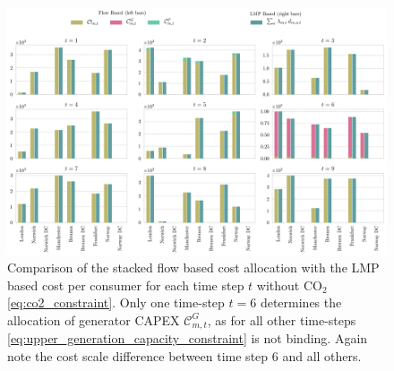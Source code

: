 \documentclass[11pt]{article}
\newcommand{\allocateCapexGeneration}{\mathcal{C}^{G}_{m,t}}
\begin{document}
\begin{figure}[h]
    \centering
    \includegraphics[width=\textwidth]{compare_allocation_relaxed_co2.png}
    \caption{Comparison of the stacked flow based cost allocation with the LMP based cost per consumer for each time step $t$ without CO$_2$ \cref{eq:co2_constraint}. Only one time-step $t=6$ determines the allocation of generator CAPEX $\allocateCapexGeneration$, as for all other time-steps \cref{eq:upper_generation_capacity_constraint} is not binding. Again note the cost scale difference between time step 6 and all others.}
    \label{fig:cost_allocation}
\end{figure}

% 
    
\end{document}
